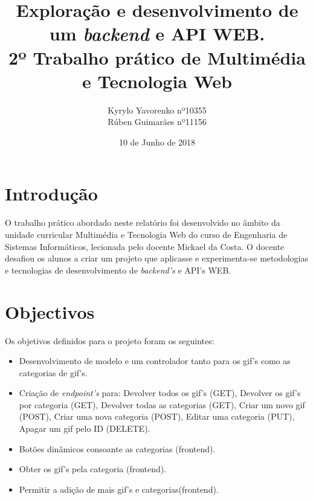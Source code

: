 \documentclass[11pt]{report}
\title{\textbf{Exploração e desenvolvimento de um \textit{backend} e API WEB.}\\
		\large2º Trabalho prático de
		Multimédia e Tecnologia Web}
\author{ Kyrylo Yavorenko nº10355 \\ Rúben Guimarães nº11156}
\affil{Escola Superior de Tecnologia, IPCA \\
	Barcelos}
\date{10 de Junho de 2018}
\begin{document}
\maketitle






\chapter*{Introdução}

O trabalho prático abordado neste relatório foi desenvolvido no âmbito da unidade curricular Multimédia e Tecnologia Web do curso de Engenharia de Sistemas Informáticos, lecionada pelo docente Mickael da Costa. O docente desafiou os alunos a criar um projeto que aplicasse e experimenta-se metodologias e tecnologias de desenvolvimento de \textit{backend's} e API's WEB.

\clearpage






\chapter*{Objectivos}

Os objetivos definidos para o projeto foram os seguintes:

\begin{itemize}
\item Desenvolvimento de modelo e um controlador tanto para os gif's como as categorias de gif's.
\item Criação de \textit{endpoint's} para:
	\subitem Devolver todos os gif's (GET),
	\subitem Devolver os gif's por categoria (GET),
	\subitem Devolver todas as categorias (GET),
	\subitem Criar um novo gif (POST),
	\subitem Criar uma nova categoria (POST),
	\subitem Editar uma categoria (PUT),
	\subitem Apagar um gif pelo ID (DELETE).
\item Botões dinâmicos consoante as categorias (frontend).
\item Obter os gif's pela categoria (frontend).
\item Permitir a adição de mais gif's e categorias(frontend).

\end{itemize}



\clearpage
\end{document}

